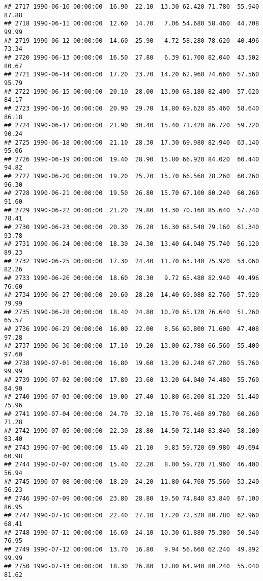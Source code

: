 \documentclass{article}\usepackage{graphicx, color}
\makeatletter
\newenvironment{kframe}{%
 \def\at@end@of@kframe{}%
 \ifinner\ifhmode%
  \def\at@end@of@kframe{\end{minipage}}%
  \begin{minipage}{\columnwidth}%
 \fi\fi%
 \def\FrameCommand##1{\hskip\@totalleftmargin \hskip-\fboxsep
 \colorbox{shadecolor}{##1}\hskip-\fboxsep
     \hskip-\linewidth \hskip-\@totalleftmargin \hskip\columnwidth}%
 \MakeFramed {\advance\hsize-\width
   \@totalleftmargin\z@ \linewidth\hsize
   \@setminipage}}%
 {\par\unskip\endMakeFramed%
 \at@end@of@kframe}
\newenvironment{knitrout}{}{} %
\makeatother
\begin{document}
\begin{knitrout}
\begin{kframe}
\begin{verbatim}
## 2717 1990-06-10 00:00:00  16.90  22.10  13.30 62.420 71.780  55.940  87.88
## 2718 1990-06-11 00:00:00  12.60  14.70   7.06 54.680 58.460  44.708  99.99
## 2719 1990-06-12 00:00:00  14.60  25.90   4.72 58.280 78.620  40.496  73.34
## 2720 1990-06-13 00:00:00  16.50  27.80   6.39 61.700 82.040  43.502  80.67
## 2721 1990-06-14 00:00:00  17.20  23.70  14.20 62.960 74.660  57.560  95.79
## 2722 1990-06-15 00:00:00  20.10  28.00  13.90 68.180 82.400  57.020  84.17
## 2723 1990-06-16 00:00:00  20.90  29.70  14.80 69.620 85.460  58.640  86.18
## 2724 1990-06-17 00:00:00  21.90  30.40  15.40 71.420 86.720  59.720  90.24
## 2725 1990-06-18 00:00:00  21.10  28.30  17.30 69.980 82.940  63.140  95.06
## 2726 1990-06-19 00:00:00  19.40  28.90  15.80 66.920 84.020  60.440  94.82
## 2727 1990-06-20 00:00:00  19.20  25.70  15.70 66.560 78.260  60.260  96.30
## 2728 1990-06-21 00:00:00  19.50  26.80  15.70 67.100 80.240  60.260  91.60
## 2729 1990-06-22 00:00:00  21.20  29.80  14.30 70.160 85.640  57.740  78.41
## 2730 1990-06-23 00:00:00  20.30  26.20  16.30 68.540 79.160  61.340  93.78
## 2731 1990-06-24 00:00:00  18.30  24.30  13.40 64.940 75.740  56.120  89.23
## 2732 1990-06-25 00:00:00  17.30  24.40  11.70 63.140 75.920  53.060  82.26
## 2733 1990-06-26 00:00:00  18.60  28.30   9.72 65.480 82.940  49.496  76.60
## 2734 1990-06-27 00:00:00  20.60  28.20  14.40 69.080 82.760  57.920  79.99
## 2735 1990-06-28 00:00:00  18.40  24.80  10.70 65.120 76.640  51.260  65.57
## 2736 1990-06-29 00:00:00  16.00  22.00   8.56 60.800 71.600  47.408  97.28
## 2737 1990-06-30 00:00:00  17.10  19.20  13.00 62.780 66.560  55.400  97.60
## 2738 1990-07-01 00:00:00  16.80  19.60  13.20 62.240 67.280  55.760  99.99
## 2739 1990-07-02 00:00:00  17.80  23.60  13.20 64.040 74.480  55.760  84.90
## 2740 1990-07-03 00:00:00  19.00  27.40  10.80 66.200 81.320  51.440  75.96
## 2741 1990-07-04 00:00:00  24.70  32.10  15.70 76.460 89.780  60.260  71.28
## 2742 1990-07-05 00:00:00  22.30  28.80  14.50 72.140 83.840  58.100  83.40
## 2743 1990-07-06 00:00:00  15.40  21.10   9.83 59.720 69.980  49.694  60.98
## 2744 1990-07-07 00:00:00  15.40  22.20   8.00 59.720 71.960  46.400  56.94
## 2745 1990-07-08 00:00:00  18.20  24.20  11.80 64.760 75.560  53.240  56.23
## 2746 1990-07-09 00:00:00  23.80  28.80  19.50 74.840 83.840  67.100  86.95
## 2747 1990-07-10 00:00:00  22.40  27.10  17.20 72.320 80.780  62.960  68.41
## 2748 1990-07-11 00:00:00  16.60  24.10  10.30 61.880 75.380  50.540  76.95
## 2749 1990-07-12 00:00:00  13.70  16.80   9.94 56.660 62.240  49.892  99.99
## 2750 1990-07-13 00:00:00  18.30  26.80  12.80 64.940 80.240  55.040  81.62

\end{verbatim}
\end{kframe}
\end{knitrout}
\end{document}
